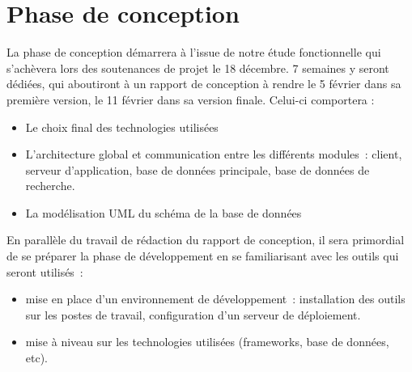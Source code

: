 \section{Phase de conception}

	La phase de conception démarrera à l'issue de notre étude fonctionnelle qui s'achèvera lors des soutenances de projet le 18 décembre.  7 semaines y seront dédiées, qui aboutiront à un rapport de conception à rendre le 5 février dans sa première version, le 11 février dans sa version finale. Celui-ci comportera :
\begin{itemize}
\item Le choix final des technologies utilisées
\item L'architecture global et communication entre les différents modules : client, serveur d'application, base de données principale, base de données de recherche.
\item La modélisation UML du schéma de la base de données
\end{itemize}

	En parallèle du travail de rédaction du rapport de conception, il sera primordial de se préparer la phase de développement en se familiarisant avec les outils qui seront utilisés :
\begin{itemize}
\item mise en place d'un environnement de développement : installation des outils sur les postes de travail, configuration d'un serveur de déploiement.
\item mise à niveau sur les technologies utilisées (frameworks, base de données, etc).
\end{itemize}